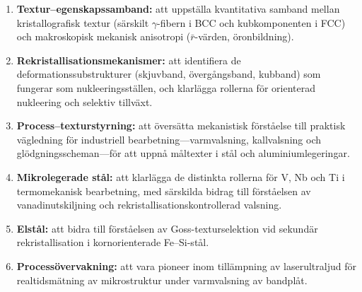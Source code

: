 \documentclass[11pt,a4paper]{article}
\begin{document}
\begin{enumerate}
  \item \textbf{Textur--egenskapssamband:} att uppst\"alla kvantitativa
    samband mellan kristallografisk textur (s\"arskilt
    $\gamma$-fibern i BCC och kubkomponenten i FCC) och makroskopisk
    mekanisk anisotropi ($\bar{r}$-v\"arden, \"oronbildning).

  \item \textbf{Rekristallisationsmekanismer:} att identifiera de
    deformationssubstrukturer (skjuvband, \"overg\aa{}ngsband,
    kubband) som fungerar som nukleeringsst\"allen, och klar\-l\"agga
    rollerna f\"or orienterad nukleering och selektiv tillv\"axt.

  \item \textbf{Process--texturstyrning:} att \"overs\"atta mekanistisk
    f\"orst\aa{}else till praktisk v\"agledning f\"or industriell
    bearbetning---varmvalsning, kallvalsning och
    gl\"odgningsscheman---f\"or att uppn\aa{} m\aa{}ltexter i st\aa{}l
    och aluminiumlegeringar.

  \item \textbf{Mikrolegerade st\aa{}l:} att klar\-l\"agga de distinkta
    rollerna f\"or V, Nb och Ti i termomekanisk bearbetning, med
    s\"arskilda bidrag till f\"orst\aa{}elsen av vanadinutskiljning och
    rekristallisationskontrollerad valsning.

  \item \textbf{Elst\aa{}l:} att bidra till f\"orst\aa{}elsen av
    Goss-texturselektion vid sekund\"ar rekristallisation i
    kornorienterade Fe--Si-st\aa{}l.

  \item \textbf{Process\"overvakning:} att vara pioneer inom
    till\"ampning av laserultraljud f\"or realtidsm\"atning av
    mikrostruktur under varmvalsning av bandpl\aa{}t.
\end{enumerate}
\end{document}
